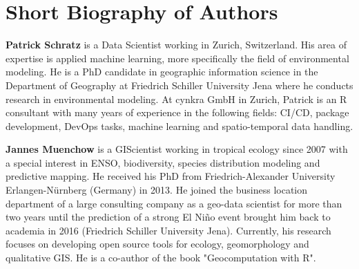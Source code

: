 \documentclass[remotesensing,article,submit,moreauthors,pdftex]{Definitions/mdpi}
\begin{document}
\section*{Short Biography of Authors}
\bio
{}
{\textbf{Patrick Schratz} is a Data Scientist working in Zurich, Switzerland.
	His area of expertise is applied machine learning, more specifically the field of environmental modeling.
	He is a PhD candidate in geographic information science in the Department of Geography at Friedrich Schiller University Jena where he conducts research in environmental modeling.
	At cynkra GmbH in Zurich, Patrick is an R consultant with many years of experience in the following fields: CI/CD, package development, DevOps tasks, machine learning and spatio-temporal data handling.}

\bio
{}
{\textbf{Jannes Muenchow} is a GIScientist working in tropical ecology since 2007 with a special interest in ENSO, biodiversity, species distribution modeling and predictive mapping.
	He received his PhD from Friedrich-Alexander University Erlangen-Nürnberg (Germany) in 2013.
	He joined the business location department of a large consulting company as a geo-data scientist for more than two years until the prediction of a strong El Niño event brought him back to academia in 2016 (Friedrich Schiller University Jena).
	Currently, his research focuses on developing open source tools for ecology, geomorphology and qualitative GIS.
	He is a co-author of the book "Geocomputation with R".}
\end{document}
